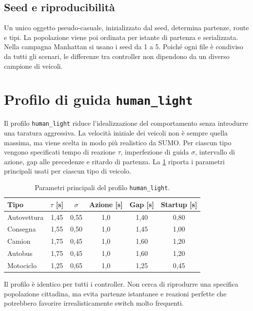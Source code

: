 \documentclass[12pt,a4paper,oneside]{report}
\numberwithin{equation}{chapter}
\begin{document}
\subsection{Seed e riproducibilità}

Un unico oggetto pseudo-casuale, inizializzato dal seed, determina partenze,
route e tipi. La popolazione viene poi ordinata per istante di partenza e
serializzata. Nella campagna Manhattan si usano i seed da 1 a 5. Poiché ogni
file è condiviso da tutti gli scenari, le differenze tra controller non
dipendono da un diverso campione di veicoli.

\section{Profilo di guida \texttt{human\_light}}

Il profilo \texttt{human\_light} riduce l'idealizzazione del comportamento
senza introdurre una taratura aggressiva. La velocità iniziale dei veicoli non
è sempre quella massima, ma viene scelta in modo più realistico da SUMO. Per
ciascun tipo vengono specificati tempo di reazione $\tau$, imperfezione di
guida $\sigma$, intervallo di azione, gap alle precedenze e ritardo di
partenza. La \cref{tab:human_light} riporta i parametri principali usati per
ciascun tipo di veicolo.

\begin{table}[htbp]
    \centering
    \caption{Parametri principali del profilo \texttt{human\_light}.}
    \label{tab:human_light}
    \begin{tabular}{lccccc}
        \toprule
        Tipo & $\tau$ [s] & $\sigma$ & Azione [s] & Gap [s] & Startup [s] \\
        \midrule
        Autovettura & 1,45 & 0,55 & 1,0 & 1,40 & 0,80 \\
        Consegna    & 1,55 & 0,50 & 1,0 & 1,45 & 1,00 \\
        Camion      & 1,75 & 0,45 & 1,0 & 1,60 & 1,20 \\
        Autobus     & 1,75 & 0,45 & 1,0 & 1,60 & 1,20 \\
        Motociclo   & 1,25 & 0,65 & 1,0 & 1,25 & 0,45 \\
        \bottomrule
    \end{tabular}
\end{table}

Il profilo è identico per tutti i controller. Non cerca di riprodurre una
specifica popolazione cittadina, ma evita partenze istantanee e reazioni
perfette che potrebbero favorire irrealisticamente switch molto frequenti.
\end{document}
